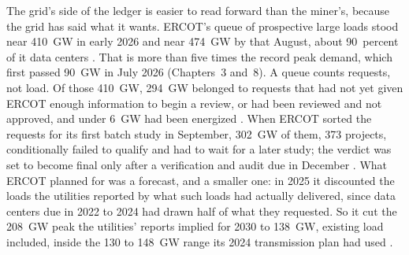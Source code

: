 The grid's side of the ledger is easier to read forward than the miner's, because the grid has said what it wants. ERCOT's queue of prospective large loads stood near 410~GW in early 2026 and near 474~GW by that August, about 90~percent of it data centers \autocite{abbott2026datacenters}. That is more than five times the record peak demand, which first passed 90~GW in July 2026 (Chapters~3 and~8). %
A queue counts requests, not load. Of those 410~GW, 294~GW belonged to requests that had not yet given ERCOT enough information to begin a review, or had been reviewed and not approved, and under 6~GW had been energized \autocite{vegas2026senateupdate,ercot2026llistatus}. %
When ERCOT sorted the requests for its first batch study in September, 302~GW of them, 373 projects, conditionally failed to qualify and had to wait for a later study; the verdict was set to become final only after a verification and audit due in December \autocite{ercot2026batchzero,ercot2026ltlfadjust}. %
What ERCOT planned for was a forecast, and a smaller one: in 2025 it discounted the loads the utilities reported by what such loads had actually delivered, since data centers due in 2022 to 2024 had drawn half of what they requested. So it cut the 208~GW peak the utilities' reports implied for 2030 to 138~GW, existing load included, inside the 130 to 148~GW range its 2024 transmission plan had used \autocite{ercot2025ltlf}. %
